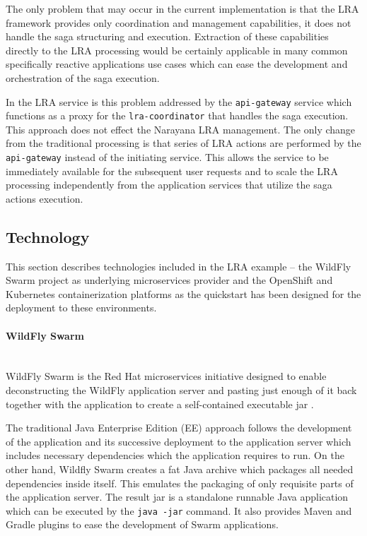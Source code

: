 \documentclass[oneside,
  digital, %
  table,   %
  nolof,     %
  nolot,     %
]{fithesis3}
\newcommand{\newlinepar}[1]{\paragraph{#1}\needspace{4\baselineskip}\mbox{}\\}
\begin{document}
The only problem that may occur in the current implementation is that the LRA framework provides only coordination and management capabilities, it does not handle the saga structuring and execution. Extraction of these capabilities directly to the LRA processing would be certainly applicable in many common specifically reactive applications use cases which can ease the development and orchestration of the saga execution. 

In the LRA service is this problem addressed by the \texttt{api-gateway} service which functions as a proxy for the \texttt{lra-coordinator} that handles the saga execution. This approach does not effect the Narayana LRA management. The only change from the traditional processing is that series of LRA actions are performed by the \texttt{api-gateway} instead of the initiating service. This allows the service to be immediately available for the subsequent user requests and to scale the LRA processing independently from the application services that utilize the saga actions execution.

\subsection{Technology}

This section describes technologies included in the LRA example -- the WildFly Swarm project as underlying microservices provider and the OpenShift and Kubernetes containerization platforms as the quickstart has been designed for the deployment to these environments.

\newlinepar{WildFly Swarm}

WildFly Swarm is the Red Hat microservices initiative designed to enable deconstructing the WildFly application server and pasting just enough of it back together with the application to create a self-contained executable jar \cite{gupta_2018}. 

The traditional Java Enterprise Edition (EE) approach follows the development of the application and its successive deployment to the application server which includes necessary dependencies which the application requires to run. On the other hand, Wildfly Swarm creates a fat Java archive which packages all needed dependencies inside itself. This emulates the packaging of only requisite parts of the application server. The result jar is a standalone runnable Java application which can be executed by the \texttt{java -jar} command. It also provides Maven and Gradle plugins to ease the development of Swarm applications.
\end{document}
